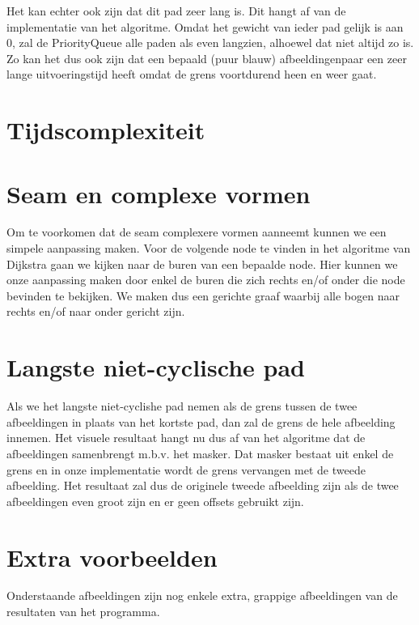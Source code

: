 \documentclass{article}
\begin{document}
Het kan echter ook zijn dat dit pad zeer lang is. Dit hangt af van de implementatie van het algoritme. Omdat het gewicht van ieder pad gelijk
is aan 0, zal de PriorityQueue alle paden als \textquotedbl even lang\textquotedbl  zien, alhoewel dat niet altijd zo is. Zo kan het dus ook zijn dat een bepaald
(puur blauw) afbeeldingenpaar een zeer lange uitvoeringstijd heeft omdat de grens voortdurend heen en weer gaat.

\section{Tijdscomplexiteit}

\newpage
\section{Seam en complexe vormen}
Om te voorkomen dat de seam complexere vormen aanneemt kunnen we een simpele aanpassing maken. Voor de volgende node te vinden in het algoritme
van Dijkstra gaan we kijken naar de buren van een bepaalde node. Hier kunnen we onze aanpassing maken door enkel de buren die zich rechts en/of onder
die node bevinden te bekijken. We maken dus een gerichte graaf waarbij alle bogen naar rechts en/of naar onder gericht zijn.

\section{Langste niet-cyclische pad}
Als we het langste niet-cyclishe pad nemen als de grens tussen de twee afbeeldingen in plaats van het kortste pad, dan zal de grens de hele
afbeelding innemen. Het visuele resultaat hangt nu dus af van het algoritme dat de afbeeldingen samenbrengt m.b.v. het masker. Dat masker bestaat
uit enkel de grens en in onze implementatie wordt de grens vervangen met de tweede afbeelding. Het resultaat zal dus de originele tweede afbeelding zijn als
de twee afbeeldingen even groot zijn en er geen offsets gebruikt zijn.

\newpage
\section{Extra voorbeelden}
Onderstaande afbeeldingen zijn nog enkele extra, grappige afbeeldingen van de resultaten van het programma.
\end{document}
